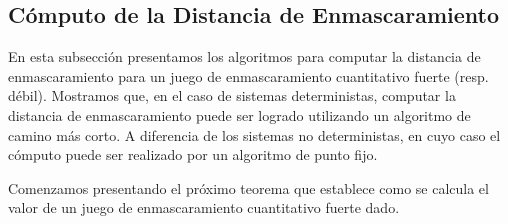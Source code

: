 \subsection{Cómputo de la Distancia de Enmascaramiento}

En esta subsección presentamos los algoritmos para computar la distancia de enmascaramiento para un juego de enmascaramiento cuantitativo fuerte (resp. débil). Mostramos que, en el caso de sistemas deterministas, computar la distancia de enmascaramiento puede ser logrado utilizando un algoritmo de camino más corto. A diferencia de los sistemas no deterministas, en cuyo caso el cómputo puede ser realizado por un algoritmo de punto fijo.

Comenzamos presentando el próximo teorema que establece como se calcula el valor de un juego de enmascaramiento cuantitativo fuerte dado.
%

